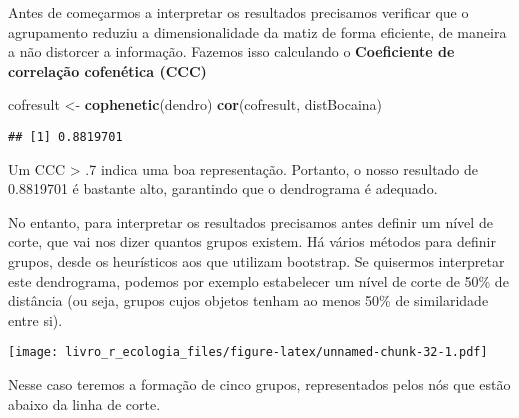 \documentclass[
]{book}
\newenvironment{Shaded}{\begin{snugshade}}{\end{snugshade}}
\newcommand{\DataTypeTok}[1]{\textcolor[rgb]{0.13,0.29,0.53}{#1}}
\newcommand{\DecValTok}[1]{\textcolor[rgb]{0.00,0.00,0.81}{#1}}
\newcommand{\KeywordTok}[1]{\textcolor[rgb]{0.13,0.29,0.53}{\textbf{#1}}}
\newcommand{\NormalTok}[1]{#1}
\newcommand{\OperatorTok}[1]{\textcolor[rgb]{0.81,0.36,0.00}{\textbf{#1}}}
\newcommand{\StringTok}[1]{\textcolor[rgb]{0.31,0.60,0.02}{#1}}
\begin{document}
Antes de começarmos a interpretar os resultados precisamos verificar que o agrupamento reduziu a dimensionalidade da matiz de forma eficiente, de maneira a não distorcer a informação. Fazemos isso calculando o \textbf{Coeficiente de correlação cofenética (CCC)}

\begin{Shaded}
\begin{Highlighting}[]
\NormalTok{cofresult <-}\StringTok{ }\KeywordTok{cophenetic}\NormalTok{(dendro)}
\KeywordTok{cor}\NormalTok{(cofresult, distBocaina)}
\end{Highlighting}
\end{Shaded}

\begin{verbatim}
## [1] 0.8819701
\end{verbatim}

Um CCC \textgreater{} .7 indica uma boa representação. Portanto, o nosso resultado de 0.8819701 é bastante alto, garantindo que o dendrograma é adequado.

No entanto, para interpretar os resultados precisamos antes definir um nível de corte, que vai nos dizer quantos grupos existem. Há vários métodos para definir grupos, desde os heurísticos aos que utilizam bootstrap. Se quisermos interpretar este dendrograma, podemos por exemplo estabelecer um nível de corte de 50\% de distância (ou seja, grupos cujos objetos tenham ao menos 50\% de similaridade entre si).

\begin{Shaded}
\end{Shaded}

\texttt{[image: livro\_r\_ecologia\_files/figure-latex/unnamed-chunk-32-1.pdf]}

Nesse caso teremos a formação de cinco grupos, representados pelos nós que estão abaixo da linha de corte.
\end{document}
